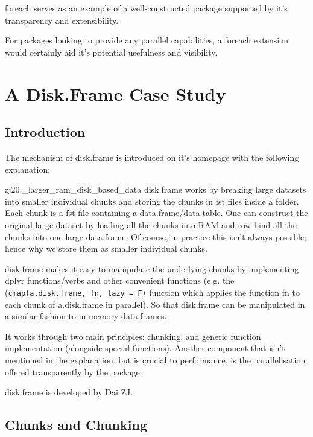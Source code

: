 \documentclass[a4paper,10pt]{article}
\begin{document}
foreach serves as an example of a well-constructed package supported
by it's transparency and extensibility.

For packages looking to provide any parallel capabilities, a foreach
extension would certainly aid it's potential usefulness and
visibility.

\section{A Disk.Frame Case Study}

\subsection{Introduction}
\label{sec:introduction}

The mechanism of disk.frame is introduced on it's homepage with the
following explanation:

\begin{displaycquote}{zj20:_larger_ram_disk_based_data}
	{disk.frame} works by breaking large datasets into smaller
	individual chunks and storing the chunks in fst files inside a
	folder. Each chunk is a fst file containing a data.frame/data.table.
	One can construct the original large dataset by loading all the
	chunks into RAM and row-bind all the chunks into one large
	data.frame. Of course, in practice this isn't always possible; hence
	why we store them as smaller individual chunks.

		{disk.frame} makes it easy to manipulate the underlying chunks by
	implementing dplyr functions/verbs and other convenient functions
	(e.g. the (\texttt{cmap(a.disk.frame, fn, lazy = F)} function which
	applies the function fn to each chunk of a.disk.frame in parallel).
	So that {disk.frame} can be manipulated in a similar fashion to
	in-memory data.frames.
\end{displaycquote}

It works through two main principles: chunking, and generic function
implementation (alongside special functions). Another component that
isn't mentioned in the explanation, but is crucial to performance, is
the parallelisation offered transparently by the package.

disk.frame is developed by Dai ZJ.

\subsection{Chunks and Chunking}
\label{sec:chunking}
\end{document}
